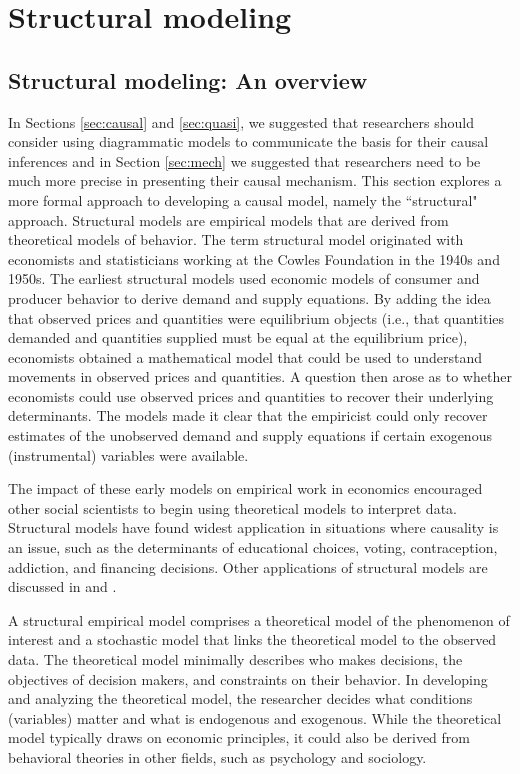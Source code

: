 \section{Structural modeling} \label{sec:struct}

\subsection{Structural modeling: An overview}

In Sections \ref{sec:causal} and \ref{sec:quasi}, we suggested that researchers should consider using diagrammatic models to communicate the basis for their causal inferences and in Section \ref{sec:mech} we suggested that researchers need to be much more precise in presenting their causal mechanism.
This section explores a more formal approach to developing a causal model, namely the ``structural" approach.
Structural models are empirical models that are derived from theoretical models of behavior.
The term structural model originated with economists and statisticians working at the Cowles Foundation in the 1940s and 1950s.
The earliest structural models used economic models of consumer and producer behavior to derive demand and supply equations.
By adding the idea that observed prices and quantities were equilibrium objects (i.e., that quantities demanded and quantities supplied must be equal at the equilibrium price), economists obtained a mathematical model that could be used to understand movements in observed prices and quantities. 
A question then arose as to whether economists could use observed prices and quantities to recover their underlying determinants.
The models made it clear that the empiricist could only recover estimates of the unobserved demand and supply equations if certain exogenous (instrumental) variables were available. 

The impact of these early models on empirical work in economics encouraged other social scientists to begin using theoretical models to interpret data. 
Structural models have found widest application in situations where causality is an issue, such as the determinants of educational choices, voting, contraception, addiction, and financing decisions. 
Other applications of structural models are discussed in \citet{Reiss:2007ej} and \citet{Reiss:2011go}.

A structural empirical model comprises a theoretical model of the phenomenon of interest and a stochastic model that links the theoretical model to the observed data.
The theoretical model minimally describes who makes decisions, the objectives of decision makers, and constraints on their behavior.
In developing and analyzing the theoretical model, the researcher decides what conditions (variables) matter and what is endogenous and exogenous.
While the theoretical model typically draws on economic principles, it could also be derived from behavioral theories in other fields, such as psychology and sociology.

